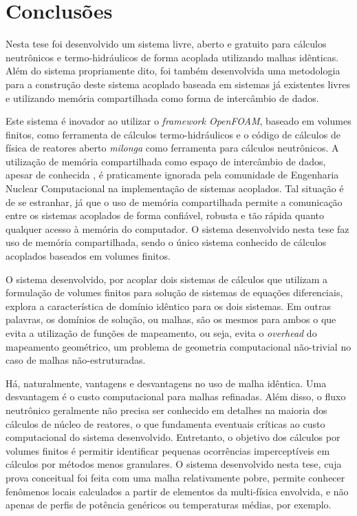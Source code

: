 \chapter{Conclusões}
\label{chap:conclusoes}

Nesta tese foi desenvolvido um sistema livre, aberto e gratuito para
cálculos neutrônicos e termo-hidráulicos de forma acoplada utilizando
malhas idênticas. Além do sistema propriamente dito, foi também desenvolvida
uma metodologia para a construção deste sistema acoplado baseada em sistemas
já existentes livres e utilizando memória compartilhada como forma de
intercâmbio de dados.

Este sistema é inovador ao utilizar o \textit{framework OpenFOAM}, baseado
em volumes finitos, como ferramenta de cálculos termo-hidráulicos e o
código de cálculos de física de reatores aberto \textit{milonga} como ferramenta
para cálculos neutrônicos. A utilização de memória compartilhada como
espaço de intercâmbio de dados, apesar de conhecida \cite{Maciel2011, Theler2013},
é praticamente ignorada pela comunidade de Engenharia Nuclear Computacional na
implementação de sistemas acoplados. Tal situação é de se estranhar, já que o
uso de memória compartilhada permite a comunicação entre os sistemas acoplados
de forma confiável, robusta e tão rápida quanto qualquer acesso à memória
do computador. O sistema desenvolvido nesta tese faz uso de memória compartilhada,
sendo o único sistema conhecido de cálculos acoplados baseados em volumes finitos. 

O sistema desenvolvido, por acoplar dois sistemas de cálculos que utilizam
a formulação de volumes finitos para solução de sistemas de equações diferenciais,
explora a característica de domínio idêntico para os dois sistemas. Em outras palavras,
os domínios de solução, ou malhas, são os mesmos para ambos o que evita a utilização
de funções de mapeamento, ou seja, evita o \textit{overhead} do mapeamento geométrico,
um problema de geometria computacional não-trivial no caso de malhas não-estruturadas.

Há, naturalmente, vantagens e desvantagens no uso de malha idêntica. Uma desvantagem
é o custo computacional para malhas refinadas. Além disso, o fluxo neutrônico geralmente
não precisa ser conhecido em detalhes na maioria dos cálculos de núcleo de reatores,
o que fundamenta eventuais críticas ao custo computacional do sistema desenvolvido. 
Entretanto, o objetivo dos cálculos por volumes
finitos é permitir identificar pequenas ocorrências imperceptíveis
em cálculos por métodos menos granulares. O sistema desenvolvido nesta tese, cuja
prova conceitual foi feita com uma malha relativamente pobre, permite conhecer fenômenos
locais calculados a partir de elementos da multi-física envolvida, e não apenas
de perfis de potência genéricos ou temperaturas médias, por exemplo. 

